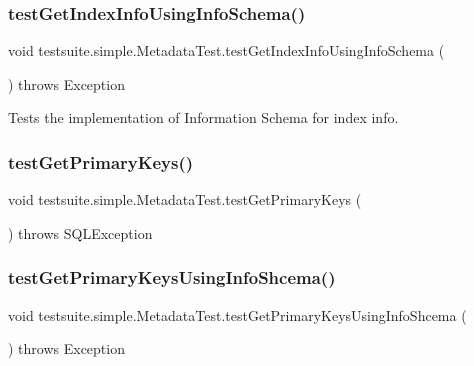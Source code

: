 \subsubsection{\texorpdfstring{test\+Get\+Index\+Info\+Using\+Info\+Schema()}{testGetIndexInfoUsingInfoSchema()}}
{\footnotesize\ttfamily void testsuite.\+simple.\+Metadata\+Test.\+test\+Get\+Index\+Info\+Using\+Info\+Schema (\begin{DoxyParamCaption}{ }\end{DoxyParamCaption}) throws Exception}

Tests the implementation of Information Schema for index info. \mbox{\label{classtestsuite_1_1simple_1_1_metadata_test_acfb4e086733eadeb53074eb34cf25c97}} 
\subsubsection{\texorpdfstring{test\+Get\+Primary\+Keys()}{testGetPrimaryKeys()}}
{\footnotesize\ttfamily void testsuite.\+simple.\+Metadata\+Test.\+test\+Get\+Primary\+Keys (\begin{DoxyParamCaption}{ }\end{DoxyParamCaption}) throws S\+Q\+L\+Exception}

\mbox{\label{classtestsuite_1_1simple_1_1_metadata_test_aec0bf7b994940c84160bf6100daf09bd}} 
\subsubsection{\texorpdfstring{test\+Get\+Primary\+Keys\+Using\+Info\+Shcema()}{testGetPrimaryKeysUsingInfoShcema()}}
{\footnotesize\ttfamily void testsuite.\+simple.\+Metadata\+Test.\+test\+Get\+Primary\+Keys\+Using\+Info\+Shcema (\begin{DoxyParamCaption}{ }\end{DoxyParamCaption}) throws Exception}

